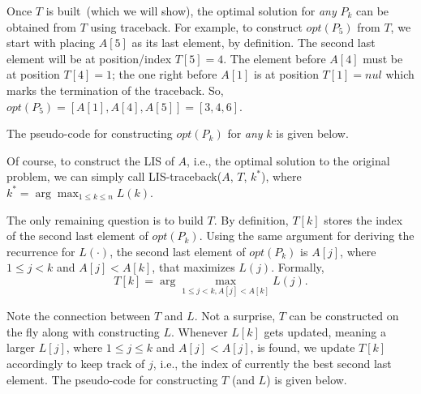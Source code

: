 Once $T$ is built~(which we will show),
the optimal solution for \emph{any} $P_k$ can be obtained from $T$ using traceback.
For example, to construct $opt(P_5)$ from $T$, we start with placing $A[5]$
as its last element, by definition. The second last element will be at position/index $T[5] = 4$. 
The element before $A[4]$ must be at position $T[4] = 1$; 
the one right before $A[1]$ is at position $T[1]=nul$ which marks the termination of the traceback.
So, $opt(P_5) = [A[1],A[4],A[5]] = [3, 4, 6]$.

The pseudo-code for constructing $opt(P_k)$ for \emph{any} $k$ is given below.

\begin{algorithmblock}[0.8\textwidth]
	\xxx
	\xxx
	\xxx
	\xxx
	\xxx
\end{algorithmblock}

Of course, to construct the LIS of $A$, i.e., the optimal solution to the original problem,
we can simply call LIS-traceback($A$, $T$, $k^*$), where $k^* = \arg\max_{1\le k \le n} L(k)$.

The only remaining question is to build $T$.
By definition, $T[k]$ stores the index of the second last element of $opt(P_k)$.
Using the same argument for deriving the recurrence for $L(\cdot)$, 
the second last element of $opt(P_k)$
is $A[j]$, where $1\le j < k$ and $A[j] < A[k]$, that maximizes $L(j)$.
Formally, $$\textstyle T[k] = \arg\max_{1\le j < k, A[j] < A[k]} L(j).$$

Note the connection between $T$ and $L$.
Not a surprise, $T$ can be constructed on the fly along with constructing $L$.
Whenever $L[k]$ gets updated, meaning a larger $L[j]$, where $1\le j \le k$ and $A[j] < A[j]$, is found, 
we update $T[k]$ accordingly to keep track of $j$, i.e., the index of currently the best second last element.
The pseudo-code for constructing $T$ (and $L$) is given below.

\begin{algorithmblock}[0.8\textwidth]
	\xxx
	\xxx
	\xxx
	\xxx
	\xxx
	\xxx
	\xxx
\end{algorithmblock}


